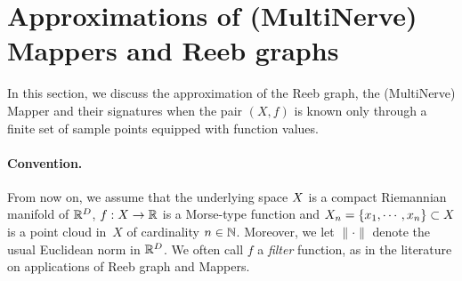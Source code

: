 


\section{Approximations of (MultiNerve) Mappers and Reeb graphs}
\label{sec:discrete}

In this section, we discuss the approximation of the Reeb graph, the (MultiNerve) Mapper
and their signatures %
when the pair $(X,f)$ is known
only through a finite set of sample points equipped with function
values. %

\paragraph*{Convention.} From now on, we assume that the underlying space $X$ 
is a compact Riemannian manifold of $\mathbb{R}^D$, %
$f:X\rightarrow\mathbb{R}$ is a Morse-type function and $X_n=\{x_1,\cdots,x_n\}\subset X$ 
is a point cloud in~$X$ of cardinality $n\in\mathbb{N}$. Moreover, we let $\|\cdot\|$ denote the usual
Euclidean norm in $\mathbb{R}^D$. We often call $f$ a {\em filter} function, as in the literature 
on applications of Reeb graph and Mappers.

